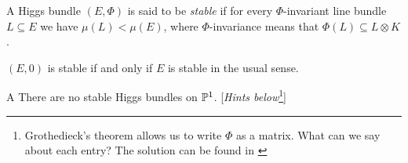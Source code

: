 \documentclass[A4paper, 12pt, british, reqno]{amsart}
\newcommand{\ot}{\otimes}
\newcommand{\op}{\oplus}
\begin{document}
\begin{udefn}[Stability]
    A Higgs bundle $(E,\Phi)$ is said to be \textit{stable} if for every $\Phi$-invariant line bundle $L\subseteq E$ we have $\mu(L)<\mu(E)$, where $\Phi$-invariance means that $\Phi(L)\subseteq L\ot K$.
\end{udefn}

\begin{urem}
    $(E,0)$ is stable if and only if $E$ is stable in the usual sense.
\end{urem}

\begin{cexe}{A}
    There are no stable Higgs bundles on $\P^{1}$.
    [\textit{Hints below}\footnote{Grothedieck's theorem allows us to write $\Phi$ as a matrix.
    What can we say about each entry?
    The solution can be found in \cite[Remark (3.2) (iii)]{hit87a}}]
\end{cexe}

\end{document}
